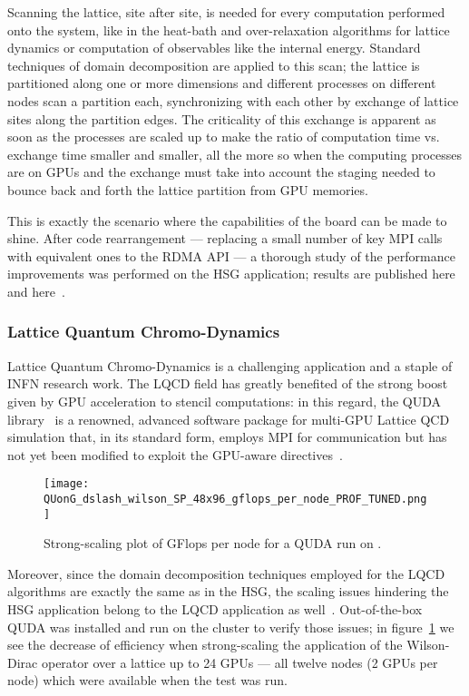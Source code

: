 Scanning the lattice, site after site, is needed for every computation
performed onto the system, like in the heat-bath and over-relaxation
algorithms for lattice dynamics or computation of observables like the
internal energy.
Standard techniques of domain decomposition are applied to this scan;
the lattice is partitioned along one or more dimensions and different
processes on different nodes scan a partition each, synchronizing with
each other by exchange of lattice sites along the partition edges.
The criticality of this exchange is apparent as soon as the processes
are scaled up to make the ratio of computation time vs. exchange time
smaller and smaller, all the more so when the computing processes are
on GPUs and the exchange must take into account the staging needed to
bounce back and forth the lattice partition from GPU memories.

This is exactly the scenario where the \PtoP capabilities of the
\apenetp board can be made to shine.
After code rearrangement --- replacing a small number of key MPI calls
with equivalent ones to the RDMA API --- a thorough study of the
performance improvements was performed on the HSG application; results
are published here~\cite{Bernaschi2013250} and here~\cite{CASS2013}.

\subsubsection{Lattice Quantum Chromo-Dynamics}
Lattice Quantum Chromo-Dynamics is a challenging application and a
staple of INFN research work.
The LQCD field has greatly benefited of the strong boost given by GPU
acceleration to stencil computations: in this regard, the QUDA
library~\cite{Clark:2009wm} is a renowned, advanced software package
for multi-GPU Lattice QCD simulation that, in its standard form,
employs MPI for communication but has not yet been modified to exploit
the GPU-aware directives~\cite{Babich:2010}.

\begin{figure}[!hbt]
  \centering
  \texttt{[image: QUonG\_dslash\_wilson\_SP\_48x96\_gflops\_per\_node\_PROF\_TUNED.png]}
  \caption{Strong-scaling plot of GFlops per node for a QUDA run on
    \quong.}
  \label{fig:qudagflops}
\end{figure}

Moreover, since the domain decomposition techniques employed for the
LQCD algorithms are exactly the same as in the HSG, the scaling issues
hindering the HSG application belong to the LQCD application as
well~\cite{Babich2:2011}.
Out-of-the-box QUDA was installed and run on the \quong cluster to
verify those issues; in figure~\ref{fig:qudagflops} we see the
decrease of efficiency when strong-scaling the application of the
Wilson-Dirac operator over a  lattice up to 24 GPUs
--- all twelve \quong nodes (2 GPUs per node) which were available
when the test was run.

